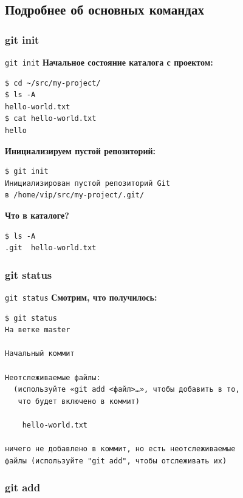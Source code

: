 \documentclass[presentation]{beamer}
\begin{document}


\subsection{Подробнее об основных командах}



\subsubsection{git init}

\begin{frame}[fragile]{\texttt{git init}}
  \textbf{Начальное состояние каталога с проектом:}
\begin{verbatim}
$ cd ~/src/my-project/
$ ls -A
hello-world.txt
$ cat hello-world.txt
hello
\end{verbatim}

  \textbf{Инициализируем пустой репозиторий:}
\begin{verbatim}
$ git init
Инициализирован пустой репозиторий Git
в /home/vip/src/my-project/.git/
\end{verbatim}

  \textbf{Что в каталоге?}
\begin{verbatim}
$ ls -A
.git  hello-world.txt
\end{verbatim}
\end{frame}



\subsubsection{git status}

\begin{frame}[fragile]{\texttt{git status}}
  \textbf{Смотрим, что получилось:}
\begin{verbatim}
$ git status
На ветке master

Начальный коммит

Неотслеживаемые файлы:
  (используйте «git add <файл>…», чтобы добавить в то,
   что будет включено в коммит)

	hello-world.txt

ничего не добавлено в коммит, но есть неотслеживаемые
файлы (используйте "git add", чтобы отслеживать их)
\end{verbatim}
\end{frame}



\subsubsection{git add}
\end{document}

